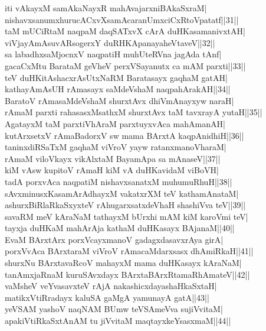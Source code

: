 \documentclass{article}
\begin{document}
iti vAkayxM samAkaNayxR mahAvajarxniBAkaSxraM|\\
nishavxsanumxhurucACxvXsamAcaranUmxciCxRtoVpatatf||31||\\
taM mUCiRtaM naqpaM daqSATxvX cArA duHKasamanivxtAH|\\
viVjayAmAsuvARsogerxY duRHKApanayaheVtaveV||32||\\
sa labadhxsaMjocnxV naqpatiH muhUteRVna jagAda tAnf|\\
gacaCxMtu BarataM geVheV perxVSayanutx ca mAM parxti||33||\\
teV duHKitAshacxrAsUtxNaRM Baratasayx gaqhaM gatAH|\\
kathayAmAsUH rAmasayx saMdeVshaM naqpahArakAH||34||\\
BaratoV rAmasaMdeVshaM shurxtAvx dhiVmAnayxyw naraH|\\
rAmaM parxti rahasasxMsathxM shurxtAvx taM tavxrayA yutaH||35||\\
AgatayxM taM parxtiVhAraM parxtuyxvAca mahAmanAH|\\
kutArxsetxV rAmaBadorxV sw mama BArxtA kaqpAnidhiH||36||\\
taninxdiRSaTxM gaqhaM viVroV yayw ratanxmanoVharaM|\\
rAmaM viloVkayx vikAlxtaM BayamApa sa mAnaseV||37||\\
kiM vAsw kupitoV rAmaH kiM vA duHKavidaM viBoVH|\\
tadA porxvAca naqpatiM nishavxsanatxM muhumuRhuH||38||\\
sAvxminusxKasamArAdhayxM vakatxrXM teV kathamAnataM|\\
ashurxBiRlaRkaSxyxteV rAhugarxsatxdeVhaH shashiVva teV||39||\\
savaRM meV kAraNaM tathayxM bUrxhi mAM kiM karoVmi teV|\\
tayxja duHKaM mahArAja kathaM duHKasayx BAjanaM||40||\\
EvaM BArxtArx porxVcayxmanoV gadagxdasavxrAya girA|\\
porxVvAca BArxtaraM viVroV rAmacaMdarxsasx dhAmiRkaH||41||\\
shurxNu BArxtavaRcoV mahayxM mama duHKasayx kAraNaM|\\
tanAmxjaRnaM kuruSAvxdayx BArxtaBArxRtamaRhAmateV||42||\\
vaMsheV veYvasavxteV rAjA nakashicxdayashaHkaSxtaH|\\
matikxVtiRradayx kaluSA gaMgA yamunayA gatA||43||\\
yeVSAM yashoV naqNAM BUmw teVSAmeVva sujiVvitaM|\\
apakiVtiRkaSxtAnAM tu jiVvitaM maqtayxkeYsasxmaM||44||\\
\end{document}

